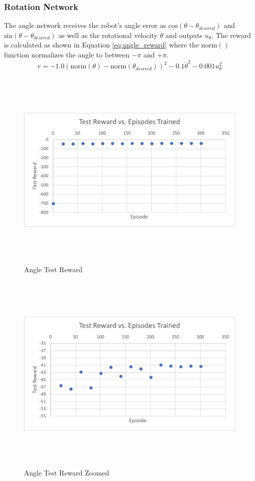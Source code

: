 \subsubsection{Rotation Network}
The angle network receives the robot's angle error as $\text{cos}(\theta-\theta_{desired})$ and $\text{sin}(\theta-\theta_{desired})$ as well as the rotational velocity $\dot{\theta}$ and outputs $u_\theta$. The reward is calculated as shown in Equation \ref{eq:angle_reward} where the $\text{norm}()$ function normalizes the angle to between $-\pi$ and $+\pi$.
\begin{equation}
r = -1.0(\text{norm}(\theta)-\text{norm}(\theta_{desired}))^2-0.1\dot{\theta}^2-0.001u_\theta^2
\label{eq:angle_reward}
\end{equation}

\begin{figure}[H]
	\centering
	\includegraphics[width=6in, height=3.85in, keepaspectratio]{figures/train_figs/angle_r.pdf}
	\caption{Angle Test Reward} \label{fig:angle_r}
\end{figure}
\begin{figure}[H]
	\centering
	\includegraphics[width=6in, height=3.85in, keepaspectratio]{figures/train_figs/angle_rzoom.pdf}
	\caption{Angle Test Reward Zoomed} \label{fig:angle_rzoom}
\end{figure}
